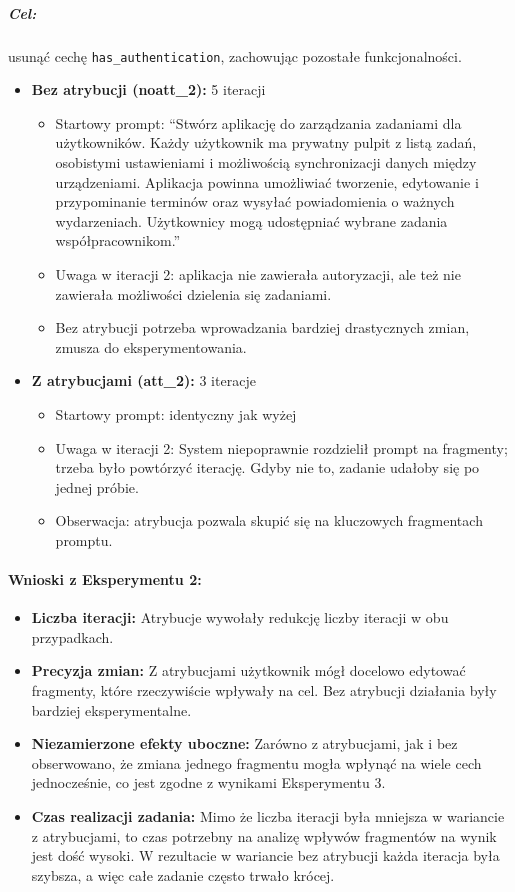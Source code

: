 \documentclass[12pt,a4paper]{article}
\begin{document}
\subparagraph{Cel:} usunąć cechę \texttt{has\_authentication}, zachowując pozostałe funkcjonalności.

\begin{itemize}
    \item \textbf{Bez atrybucji (noatt\_2):} 5 iteracji
    \begin{itemize}
        \item Startowy prompt: ``Stwórz aplikację do zarządzania zadaniami dla użytkowników. Każdy użytkownik ma prywatny pulpit z listą zadań, osobistymi ustawieniami i możliwością synchronizacji danych między urządzeniami. Aplikacja powinna umożliwiać tworzenie, edytowanie i przypominanie terminów oraz wysyłać powiadomienia o ważnych wydarzeniach. Użytkownicy mogą udostępniać wybrane zadania współpracownikom.''
        \item Uwaga w iteracji 2: aplikacja nie zawierała autoryzacji, ale też nie zawierała możliwości dzielenia się zadaniami.
        \item Bez atrybucji potrzeba wprowadzania bardziej drastycznych zmian, zmusza do eksperymentowania.
    \end{itemize}
    
    \item \textbf{Z atrybucjami (att\_2):} 3 iteracje
    \begin{itemize}
        \item Startowy prompt: identyczny jak wyżej
        \item Uwaga w iteracji 2: System niepoprawnie rozdzielił prompt na fragmenty; trzeba było powtórzyć iterację. Gdyby nie to, zadanie udałoby się po jednej próbie.
        \item Obserwacja: atrybucja pozwala skupić się na kluczowych fragmentach promptu.
    \end{itemize}
\end{itemize}

\paragraph{Wnioski z Eksperymentu 2:}

\begin{itemize}
    \item \textbf{Liczba iteracji:} Atrybucje wywołały redukcję liczby iteracji w obu przypadkach.
    \item \textbf{Precyzja zmian:} Z atrybucjami użytkownik mógł docelowo edytować fragmenty, które rzeczywiście wpływały na cel. Bez atrybucji działania były bardziej eksperymentalne.
    \item \textbf{Niezamierzone efekty uboczne:} Zarówno z atrybucjami, jak i bez obserwowano, że zmiana jednego fragmentu mogła wpłynąć na wiele cech jednocześnie, co jest zgodne z wynikami Eksperymentu 3.
    \item \textbf{Czas realizacji zadania:} Mimo że liczba iteracji była mniejsza w wariancie z atrybucjami, to czas potrzebny na analizę wpływów fragmentów na wynik jest dość wysoki. W rezultacie w wariancie bez atrybucji każda iteracja była szybsza, a więc całe zadanie często trwało krócej.
\end{itemize}
\end{document}
